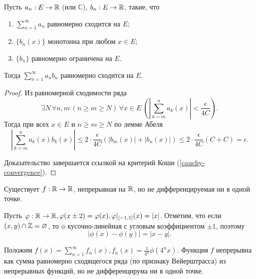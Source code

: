 \begin{theorem}
    \label{abel-func-series}
    Пусть $a_n : E \rightarrow \mathbb{R}$ (или $\mathbb{C}$), $b_n : E \rightarrow \mathbb{R}$, такие, что
    \begin{enumerate}
        \item $\sum_{n = 1}^\infty a_n$ равномерно сходится на $E$;
        \item $\{b_n(x)\}$ монотонна при любом $x \in E$;
        \item $\{b_n\}$ равномерно ограничена на $E$.
    \end{enumerate}

    Тогда $\sum_{n = 1}^\infty a_n b_n$ равномерно сходится на $E$.

    \begin{proof}
        Из равномерной сходимости ряда 
        \[\exists N \, \forall n, m \, (n \ge m \ge N) \, \forall x \in E \ \left(\left|\sum_{k = m}^n a_k(x)\right| < \frac{\epsilon}{4C}\right).\]
        Тогда при всех $x \in E$ и $n \ge m \ge N$ по лемме Абеля
        \[
            \left|\sum_{k = m}^n a_k(x) b_k(x)\right| \le 2 \cdot \frac{\epsilon}{4C} \left(|b_m(x)| + |b_n(x)|\right) \le 2 \cdot \frac{\epsilon}{4C}(C + C) = \epsilon.
        \]

        Доказательство завершается ссылкой на критерий Коши (\ref{cauchy-convergence}).
    \end{proof}
\end{theorem}

\begin{example}
    Существует $f : \mathbb{R} \rightarrow \mathbb{R}$, непрерывная на $\mathbb{R}$, но не дифференцируемая ни в одной точке.

    Пусть $\varphi: \mathbb{R} \rightarrow \mathbb{R}, \varphi(x \pm 2) = \varphi(x), \varphi|_{[-1, 1]}(x) = |x|$. Отметим, что если $(x, y) \cap \mathbb{Z} = \varnothing$, то $\phi$ кусочно-линейная с угловым коэффициентом $\pm 1$, поэтому
    \begin{equation}
        \label{vdw-eqn1}
        |\phi(x) - \phi(y)| = |x - y|.
    \end{equation}

    Положим $f(x) = \sum_{n = 1}^\infty f_n(x), f_n(x) = \frac{1}{4^n} \phi(4^n x)$. Функция $f$ непрерывна как сумма равномерно сходящегося ряда (по признаку Вейерштрасса) из непрерывных функций, но не дифференцирума ни в одной точке.
\end{example}
